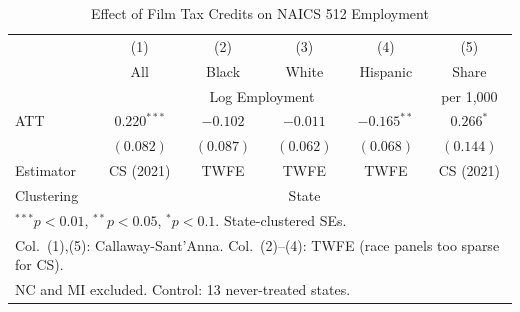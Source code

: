 \begin{table}[htbp]
\centering
\caption{Effect of Film Tax Credits on NAICS 512 Employment}
\label{tab:main}
\begin{tabular}{lccccc}
\hline\hline
 & (1) & (2) & (3) & (4) & (5) \\
 & All & Black & White & Hispanic & Share \\
 & \multicolumn{4}{c}{Log Employment} & per 1,000 \\
\hline
ATT & $0.220^{***}$ & $-0.102$ & $-0.011$ & $-0.165^{**}$ & $0.266^{*}$ \\
 & $(0.082)$ & $(0.087)$ & $(0.062)$ & $(0.068)$ & $(0.144)$ \\
\hline
Estimator & CS (2021) & TWFE & TWFE & TWFE & CS (2021) \\
Clustering & \multicolumn{5}{c}{State} \\
\hline\hline
\multicolumn{6}{l}{\footnotesize $^{***}p<0.01$, $^{**}p<0.05$, $^{*}p<0.1$. State-clustered SEs.} \\
\multicolumn{6}{l}{\footnotesize Col.~(1),(5): Callaway-Sant'Anna. Col.~(2)--(4): TWFE (race panels too sparse for CS).} \\
\multicolumn{6}{l}{\footnotesize NC and MI excluded. Control: 13 never-treated states.} \\
\end{tabular}
\end{table}

